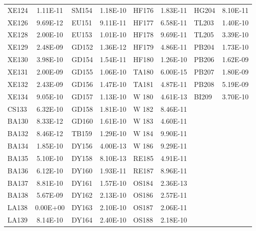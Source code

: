 \begin{table}[!tp]
\begin{minipage}{\textwidth}
{\begin{tabular}{lc|lc|lc|lc}
XE124&1.11E-11&SM154&1.18E-10&HF176&1.83E-11&HG204&8.10E-11\\
XE126&9.69E-12&EU151&9.11E-11&HF177&6.58E-11&TL203&1.40E-10\\
XE128&2.00E-10&EU153&1.01E-10&HF178&9.69E-11&TL205&3.39E-10\\
XE129&2.48E-09&GD152&1.36E-12&HF179&4.86E-11&PB204&1.73E-10\\
XE130&3.98E-10&GD154&1.54E-11&HF180&1.26E-10&PB206&1.62E-09\\
XE131&2.00E-09&GD155&1.06E-10&TA180&6.00E-15&PB207&1.80E-09\\
XE132&2.43E-09&GD156&1.47E-10&TA181&4.87E-11&PB208&5.19E-09\\
XE134&9.05E-10&GD157&1.13E-10&W 180&4.61E-13&BI209&3.70E-10\\
CS133&6.32E-10&GD158&1.81E-10&W 182&8.46E-11&&\\             
BA130&8.33E-12&GD160&1.61E-10&W 183&4.60E-11&&\\             
BA132&8.46E-12&TB159&1.29E-10&W 184&9.90E-11&&\\             
BA134&1.85E-10&DY156&4.00E-13&W 186&9.29E-11&&\\             
BA135&5.10E-10&DY158&8.10E-13&RE185&4.91E-11&&\\             
BA136&6.12E-10&DY160&1.93E-11&RE187&8.96E-11&&\\             
BA137&8.81E-10&DY161&1.57E-10&OS184&2.36E-13&&\\             
BA138&5.67E-09&DY162&2.13E-10&OS186&2.57E-11&&\\             
LA138&0.00E+00&DY163&2.10E-10&OS187&2.06E-11&&\\             
LA139&8.14E-10&DY164&2.40E-10&OS188&2.18E-10&&\\             
\hline\hline
\end{tabular}%
}
\vspace{-0.2cm}
\end{minipage}
\end{table}
\endgroup